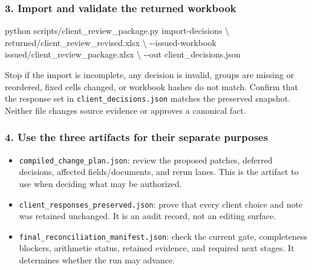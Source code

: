 \documentclass[
]{article}
\newenvironment{Shaded}{}{}
\newcommand{\AttributeTok}[1]{\textcolor[rgb]{0.49,0.56,0.16}{#1}}
\newcommand{\DataTypeTok}[1]{\textcolor[rgb]{0.56,0.13,0.00}{#1}}
\newcommand{\ExtensionTok}[1]{#1}
\newcommand{\NormalTok}[1]{#1}
\providecommand{\tightlist}{%
  \setlength{\itemsep}{0pt}\setlength{\parskip}{0pt}}
\begin{document}
\subsubsection{3. Import and validate the returned
workbook}\label{import-and-validate-the-returned-workbook}

\begin{Shaded}
\begin{Highlighting}[]
\ExtensionTok{python}\NormalTok{ scripts/client\_review\_package.py import{-}decisions }\DataTypeTok{\textbackslash{}}
\NormalTok{  returned/client\_review\_revised.xlsx }\DataTypeTok{\textbackslash{}}
  \AttributeTok{{-}{-}issued{-}workbook}\NormalTok{ issued/client\_review\_package.xlsx }\DataTypeTok{\textbackslash{}}
  \AttributeTok{{-}{-}out}\NormalTok{ client\_decisions.json}
\end{Highlighting}
\end{Shaded}

Stop if the import is incomplete, any decision is invalid, groups are
missing or reordered, fixed cells changed, or workbook hashes do not
match. Confirm that the response set in
\texttt{client\_\allowbreak{}decisions.json} matches the preserved
snapshot. Neither file changes source evidence or approves a canonical
fact.

\subsubsection{4. Use the three artifacts for their separate
purposes}\label{use-the-three-artifacts-for-their-separate-purposes}

\begin{itemize}
\tightlist
\item
  \texttt{compiled\_\allowbreak{}change\_\allowbreak{}plan.json}: review
  the proposed patches, deferred decisions, affected fields/documents,
  and rerun lanes. This is the artifact to use when deciding what may be
  authorized.
\item
  \texttt{client\_\allowbreak{}responses\_\allowbreak{}preserved.json}:
  prove that every client choice and note was retained unchanged. It is
  an audit record, not an editing surface.
\item
  \texttt{final\_\allowbreak{}reconciliation\_\allowbreak{}manifest.json}:
  check the current gate, completeness blockers, arithmetic status,
  retained evidence, and required next stages. It determines whether the
  run may advance.
\end{itemize}
\end{document}
